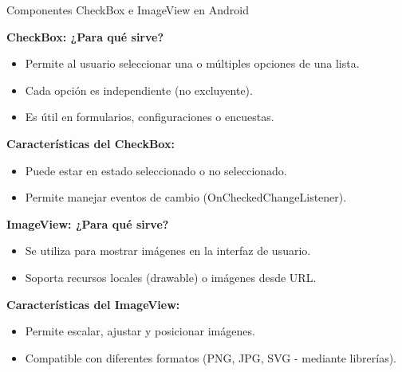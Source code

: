 \begin{frame}{Componentes CheckBox e ImageView en Android}

\textbf{CheckBox: ¿Para qué sirve?}
\begin{itemize}
    \item Permite al usuario seleccionar una o múltiples opciones de una lista.
    \item Cada opción es independiente (no excluyente).
    \item Es útil en formularios, configuraciones o encuestas.
\end{itemize}

\vspace{0.4cm}

\textbf{Características del CheckBox:}
\begin{itemize}
    \item Puede estar en estado seleccionado o no seleccionado.
    \item Permite manejar eventos de cambio (OnCheckedChangeListener).
\end{itemize}

\vspace{0.4cm}

\textbf{ImageView: ¿Para qué sirve?}
\begin{itemize}
    \item Se utiliza para mostrar imágenes en la interfaz de usuario.
    \item Soporta recursos locales (drawable) o imágenes desde URL.
\end{itemize}

\vspace{0.4cm}

\textbf{Características del ImageView:}
\begin{itemize}
    \item Permite escalar, ajustar y posicionar imágenes.
    \item Compatible con diferentes formatos (PNG, JPG, SVG - mediante librerías).
\end{itemize}


\end{frame}


